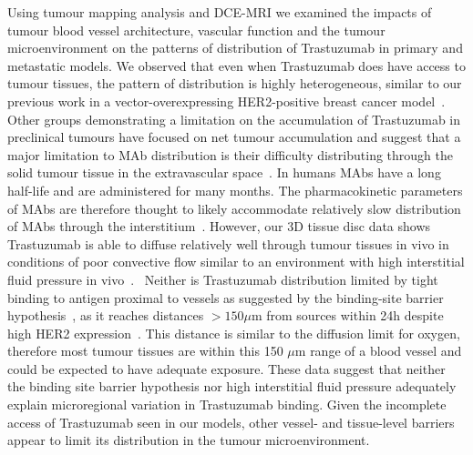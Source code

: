 Using tumour mapping analysis and \acs{DCE-MRI} we examined the impacts of tumour blood vessel architecture, vascular function and the tumour microenvironment on the patterns of distribution of Trastuzumab in primary and metastatic models.
We observed that even when Trastuzumab does have access to tumour tissues, the pattern of distribution is highly heterogeneous, similar to our previous work in a vector-overexpressing \acs{HER2}-positive breast cancer model~\cite{Baker:2008ci}.
Other groups demonstrating a limitation on the accumulation of Trastuzumab in preclinical tumours have focused on net tumour accumulation and suggest that a major limitation to \acs{MAb} distribution is their difficulty distributing through the solid tumour tissue in the extravascular space~\cite{Jain:2010ie,Chauhan:2011fi,Lee:2010gb}.
In humans \acs{MAbs} have a long half-life and are administered for many months.
The pharmacokinetic parameters of \acs{MAbs} are therefore thought to likely accommodate relatively slow distribution of \acs{MAbs} through the interstitium~\cite{Chauhan:2011fi,Thurber:2012dd}.
However, our 3D tissue disc data shows Trastuzumab is able to diffuse relatively well through tumour tissues in vivo in conditions of poor convective flow similar to an environment with high interstitial fluid pressure in vivo~\cite{Baker:2018ex}.~
Neither is Trastuzumab distribution limited by tight binding to antigen proximal to vessels as suggested by the binding-site barrier hypothesis~\cite{Juweid:1992ty}, as it reaches distances $>150 \mu$m from sources within 24h despite high \acs{HER2} expression~\cite{Baker:2018ex}.
This distance is similar to the diffusion limit for oxygen, therefore most tumour tissues are within this 150 $\mu$m range of a blood vessel and could be expected to have adequate exposure.
These data suggest that neither the binding site barrier hypothesis nor high interstitial fluid pressure adequately explain microregional variation in Trastuzumab binding.
Given the incomplete access of Trastuzumab seen in our models, other vessel- and tissue-level barriers appear to limit its distribution in the tumour microenvironment.

